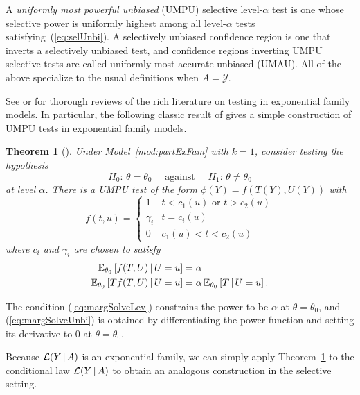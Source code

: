 \documentclass{article}
\newtheorem{theorem}{Theorem}
\theoremstyle{definition}
\newcommand{\cY}{\mathcal{Y}}
\newcommand{\cL}{\mathcal{L}}
\begin{document}
A {\em uniformly most powerful unbiased} (UMPU) selective level-$\alpha$ test is one whose selective power is uniformly highest among all level-$\alpha$ tests satisfying~(\ref{eq:selUnbi}). A selectively unbiased confidence region is one that inverts a selectively unbiased test, and confidence regions inverting UMPU selective tests are called uniformly most accurate unbiased (UMAU). All of the above specialize to the usual definitions when $A=\cY$.

See \citet{lehmann2005testing} or \citet{brown1986fundamentals} for thorough reviews of the rich literature on testing in exponential family models. In particular, the following classic result of \citet{lehmann1955completeness} gives a simple construction of UMPU tests in exponential family models.
\begin{theorem}[\citet{lehmann1955completeness}]\label{thm:margUmpu}
  Under Model~\ref{mod:partExFam}
  with $k=1$, consider testing the hypothesis
  \begin{equation}\label{eq:uniNull}
    H_0:\,\theta = \theta_0 \quad \text{ against }
    \quad H_1:\,\theta \neq \theta_0
  \end{equation}
  at level $\alpha$.
  There is a UMPU test of the form $\phi(Y) = f(T(Y), U(Y))$ with
  \begin{equation}\label{eq:testForm}
    f(t,u) = \begin{cases}
        1 & t < c_1(u) \text{ or } t > c_2(u)\\
        \gamma_i & t = c_i(u)\\
        0 & c_1(u) < t < c_2(u)
      \end{cases}
  \end{equation}
  where $c_i$ and $\gamma_i$ are chosen to satisfy
   \begin{align}\label{eq:margSolveLev}
     \mathbb{E}_{\theta_0}\left[f(T, U)\,|\, U=u\right] &= \alpha \\
     \label{eq:margSolveUnbi}
     \mathbb{E}_{\theta_0}\left[T f(T, U)\,|\, U=u\right]
     &=  \alpha\,\mathbb{E}_{\theta_0}\left[T\,|\, U=u\right].
   \end{align}
\end{theorem}
The condition (\ref{eq:margSolveLev}) constrains the power to be $\alpha$ at
$\theta=\theta_0$, and (\ref{eq:margSolveUnbi}) is obtained by
differentiating the power function and setting its derivative
to 0 at $\theta=\theta_0$.

Because $\cL( Y \gv A)$ is an exponential family, we can simply apply Theorem~\ref{thm:margUmpu} to the conditional law $\cL( Y \gv A)$ to obtain an analogous construction in the selective setting.
\end{document}
